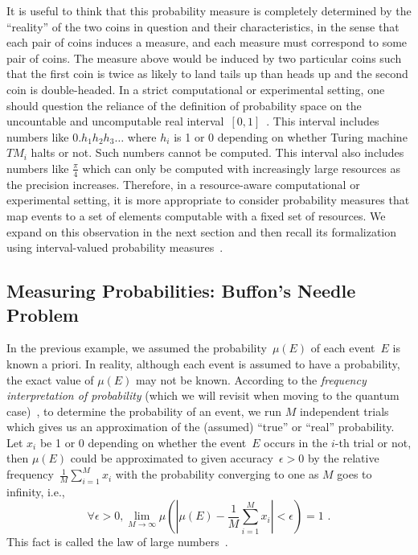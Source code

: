 \documentclass{article}
\theoremstyle{remark}
\newcommand{\pmeas}{\ensuremath{\mu}}
\begin{document}
\noindent It is useful to think that this probability measure is
completely determined by the ``reality'' of the two coins in question
and their characteristics, in the sense that each pair of coins
induces a measure, and each measure must correspond to some pair of
coins. The measure above would be induced by two particular coins such
that the first coin is twice as likely to land tails up than heads up
and the second coin is double-headed. In a strict computational
or experimental setting, one should question the reliance of the
definition of probability space on the uncountable and
uncomputable real
interval~$[0,1]$~\cite{Turing_1937,Ziegler2007,weihrauch2012computable}.
This interval includes numbers like
$0.h_{1}h_{2}h_{3}\ldots$ where $h_{i}$ is 1 or 0 depending on whether
Turing machine $\mathit{TM}_{i}$ halts or not. Such numbers cannot be
computed. This interval also includes numbers like $\frac{\pi}{4}$
which can only be computed with increasingly large resources as the
precision increases. Therefore, in a resource-aware computational or
experimental setting, it is more appropriate to consider probability
measures that map events to a set of elements computable with a fixed
set of resources. We expand on this observation in the next section
and then recall its formalization using interval-valued probability
measures~\cite{Weichselberger2000,JamisonLodwick2004}.

\subsection{Measuring Probabilities: Buffon's Needle Problem\label{subsec:Measuring-Probabilities:-Buffon}}

In the previous example, we assumed the probability~$\pmeas(E)$ of
each event~$E$ is known a priori. In reality, although each event is
assumed to have a probability, the exact value of $\pmeas(E)$ may not
be known. According to the \emph{frequency interpretation of
  probability} (which we will revisit when moving to the quantum
case)~\cite{Venn1876,Hajek2012}, 
to determine the probability of an event, we run $M$
independent trials which gives us an approximation of the (assumed)
``true'' or ``real'' probability. Let $x_{i}$ be 1 or 0 depending on
whether the event~$E$ occurs in the $i$-th trial or not, then
$\pmeas(E)$ could be approximated to given accuracy~$\epsilon>0$ by
the relative frequency~$\frac{1}{M}\sum_{i=1}^{M}x_{i}$ with the
probability converging to one as $M$ goes to infinity, i.e.,
\[
\forall\epsilon>0,\lim_{M\rightarrow\infty}\pmeas\left(\left|\pmeas(E)-\frac{1}{M}\sum_{i=1}^{M} x_{i}\right|<\epsilon\right)=1\textrm{ .}
\]
This fact is called the law of large numbers~\cite{Bernoulli2006,Kolmogorov1950,Uspensky1937,Shafer1976,544199}.
\end{document}

